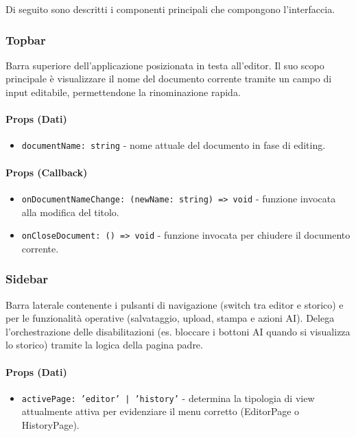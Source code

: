 \documentclass[11pt,a4paper]{article}
\begin{document}
Di seguito sono descritti i componenti principali che compongono l'interfaccia.



\subsubsection{Topbar}
Barra superiore dell'applicazione posizionata in testa all'editor. Il suo scopo principale è visualizzare il nome del documento corrente tramite un campo di input editabile, permettendone la rinominazione rapida.

\paragraph{Props (Dati)}
\begin{itemize}
    \item \texttt{documentName: string} - nome attuale del documento in fase di editing.
\end{itemize}

\paragraph{Props (Callback)}
\begin{itemize}
    \item \texttt{onDocumentNameChange: (newName: string) => void} - funzione invocata alla modifica del titolo.
    \item \texttt{onCloseDocument: () => void} - funzione invocata per chiudere il documento corrente.
\end{itemize}


\subsubsection{Sidebar}
Barra laterale contenente i pulsanti di navigazione (switch tra editor e storico) e per le funzionalità operative (salvataggio, upload, stampa e azioni AI). Delega l'orchestrazione delle disabilitazioni (es. bloccare i bottoni AI quando si visualizza lo storico) tramite la logica della pagina padre.

\paragraph{Props (Dati)}
\begin{itemize}
    \item \texttt{activePage: 'editor' | 'history'} - determina la tipologia di view attualmente attiva per evidenziare il menu corretto (EditorPage o HistoryPage).
\end{itemize}
\end{document}
